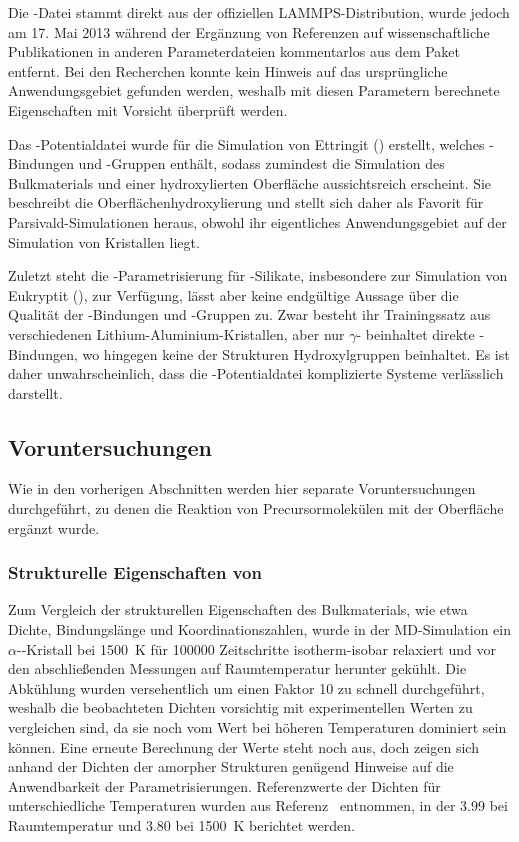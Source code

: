 Die -Datei stammt direkt aus der offiziellen LAMMPS-Distribution\cite{plimpton_lammps_2014}, wurde jedoch am 17. Mai 2013 während der Ergänzung von Referenzen auf wissenschaftliche Publikationen in anderen Parameterdateien kommentarlos aus dem Paket entfernt\cite{thompson_lammps_2013}.
Bei den Recherchen konnte kein Hinweis auf das ursprüngliche Anwendungsgebiet gefunden werden, weshalb mit diesen Parametern berechnete Eigenschaften mit Vorsicht überprüft werden.

Das -Potentialdatei wurde für die Simulation von Ettringit () erstellt, welches -Bindungen und -Gruppen enthält, sodass zumindest die Simulation des Bulkmaterials und einer hydroxylierten Oberfläche aussichtsreich erscheint.
Sie beschreibt die Oberflächenhydroxylierung und stellt sich daher als Favorit für Parsivald-Simulationen heraus, obwohl ihr eigentliches Anwendungsgebiet auf der Simulation von Kristallen liegt.

Zuletzt steht die -Parametrisierung für -Silikate, insbesondere zur Simulation von Eukryptit (), zur Verfügung, lässt aber keine endgültige Aussage über die Qualität der -Bindungen und -Gruppen zu.
Zwar besteht ihr Trainingssatz aus verschiedenen Lithium-Aluminium-Kristallen, aber nur $\gamma$- beinhaltet direkte -Bindungen, wo hingegen keine der Strukturen Hydroxylgruppen beinhaltet.
Es ist daher unwahrscheinlich, dass die -Potentialdatei komplizierte Systeme verlässlich darstellt.

\subsection{Voruntersuchungen}

Wie in den vorherigen Abschnitten werden hier separate Voruntersuchungen durchgeführt, zu denen die Reaktion von Precursormolekülen mit der Oberfläche ergänzt wurde.

\subsubsection{Strukturelle Eigenschaften von }

Zum Vergleich der strukturellen Eigenschaften des Bulkmaterials, wie etwa Dichte, Bindungslänge und Koordinationszahlen, wurde in der MD-Simulation ein $\alpha$--Kristall bei \SI{1500}{\kelvin} für \num{100000} Zeitschritte isotherm-isobar relaxiert und vor den abschließenden Messungen auf Raumtemperatur herunter gekühlt.
Die Abkühlung wurden versehentlich um einen Faktor 10 zu schnell durchgeführt, weshalb die beobachteten Dichten vorsichtig mit experimentellen Werten zu vergleichen sind, da sie noch vom Wert bei höheren Temperaturen dominiert sein können.
Eine erneute Berechnung der Werte steht noch aus, doch zeigen sich anhand der Dichten der amorpher Strukturen genügend Hinweise auf die Anwendbarkeit der Parametrisierungen.
Referenzwerte der Dichten für unterschiedliche Temperaturen wurden aus Referenz~\cite{fiquet_high-temperature_1999} entnommen, in der \SI{3.99}{\gpcc} bei Raumtemperatur und \SI{3.80}{\gpcc} bei \SI{1500}{\kelvin} berichtet werden.

